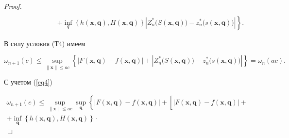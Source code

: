 \begin{proof}
\begin{gather*}
\\

\hspace{3cm}

\left.+

\inf \limits_q \left\{ h(\boldsymbol x, \boldsymbol q), H(\boldsymbol x, \boldsymbol q)

\right\}\left| Z_n^\ast \bigl(S(\boldsymbol x, \boldsymbol q)\bigr)-

z_n^\ast \bigl(s(\boldsymbol x, \boldsymbol q)\bigr)

\right| \right\}.

\end{gather*}







В силу условия (Т4) имеем

\[

\omega _{n+1} (c)\leqslant 

\sup \limits_{\|\boldsymbol x \|\leqslant ac} 

\left\{ \left| F(\boldsymbol x, \boldsymbol q)-f(\boldsymbol x, \boldsymbol q)\right|+

\left| Z_n^\ast \bigl(S(\boldsymbol x, \boldsymbol q)\bigr)-z_n^\ast \bigl(s(\boldsymbol x, \boldsymbol q)\bigr) 

\right| \right\}=\omega _n (ac).

\]

С учетом (\ref{eq4})

\begin{multline*}

\omega _{n+1} (c)\leqslant 

\sup \limits_{\| \boldsymbol x\|\leqslant ac} 

\sup \limits_{\boldsymbol q} 

\left\{\bigl|F(\boldsymbol x, \boldsymbol q)-

f(\boldsymbol x, \boldsymbol q) \bigr|+ \left[

\bigl| F(\boldsymbol x, \boldsymbol q)-f(\boldsymbol x, \boldsymbol q) \bigr|+\phantom{\inf \limits_{\boldsymbol q}}

\right.\right.

\\

\left.\left.

+\inf\limits_{\boldsymbol q} 

\left\{ h(\boldsymbol x, \boldsymbol q), H(\boldsymbol x, \boldsymbol q) \right\}\cdot


\end{multline*}
\end{proof}
